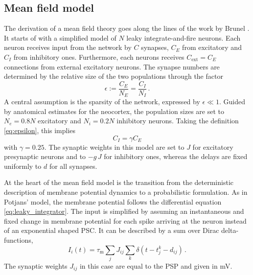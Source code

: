 \subsection{Mean field model}
The derivation of a mean field theory goes along the 
lines of the work by Brunel \cite{brunel2000}.
It starts of with a simplified model of 
$N$ leaky integrate-and-fire neurons. 
Each neuron receives input from the network by $C$ synapses, 
$C_E$ from excitatory and $C_I$ from inhibitory ones. 
Furthermore, each neurons receives $C_\text{ext} = C_E$ connections from 
external excitatory neurons.
The synapse numbers 
are determined by the relative size of the two populations through the factor
\begin{equation}
    \epsilon := \frac{C_E}{N_E} = \frac{C_I}{N_I} \,.
    \label{eq:epsilon}
\end{equation}
A central assumption is the sparsity of the network, expressed by $\epsilon \ll 1$.
Guided by anatomical estimates for the neocortex, the population sizes are set to
$N_e = 0.8N$ excitatory and $N_i = 0.2N$ inhibitory neurons. Taking the definition
\eqref{eq:epsilon}, this implies 
\begin{equation}
    C_I = \gamma C_E 	
 \label{eq:C_I}
\end{equation}
with $\gamma = 0.25$. The synaptic weights in this model are set to $J$ for 
excitatory presynaptic neurons and to $-g\, J$ for inhibitory ones, 
whereas the delays are fixed uniformly to $d$ for all synapses. 

At the heart of the mean field model
is the transition from the deterministic description of membrane potential 
dynamics to a probabilistic formulation. 
As in Potjans' model, the membrane potential follows
the differential equation \eqref{eq:leaky_integrator}. The input is simplified 
by assuming an instantaneous and fixed change in membrane potential
for each spike arriving at the neuron instead of an exponential shaped PSC.
It can be described by a sum over Dirac delta-functions, 
\begin{equation}
    I_i(t) = \tau_\text{m} \sum_j J_{ij} \sum_k \delta(t - t_j^k - d_{ij}) \,.
    \label{eq:input_const_volt}
\end{equation}
The synaptic weights $J_{ij}$ in this case are equal to the PSP and given in mV.  

